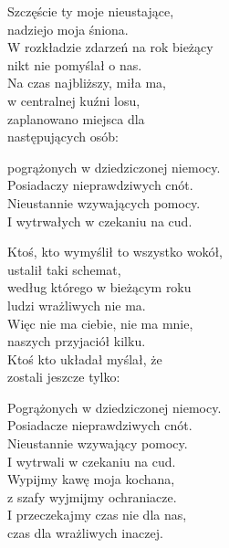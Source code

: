 \begin{text}
    Szczęście ty moje nieustające,\\
    nadziejo moja śniona.\\
    W rozkładzie zdarzeń na rok bieżący\\
    nikt nie pomyślał o nas.\\
    Na czas najbliższy, miła ma,\\
    w centralnej kuźni losu,\\
    zaplanowano miejsca dla\\
    następujących osób:

    pogrążonych w dziedziczonej niemocy.\\
    Posiadaczy nieprawdziwych cnót.\\
    Nieustannie wzywających pomocy.\\
    I wytrwałych w czekaniu na cud.

    Ktoś, kto wymyślił to wszystko wokół,\\
    ustalił taki schemat,\\
    według którego w bieżącym roku\\
    ludzi wrażliwych nie ma.\\
    Więc nie ma ciebie, nie ma mnie,\\
    naszych przyjaciół kilku.\\
    Ktoś kto układał myślał, że\\
    zostali jeszcze tylko:

    Pogrążonych w dziedziczonej niemocy.\\
    Posiadacze nieprawdziwych cnót.\\
    Nieustannie wzywający pomocy.\\
    I wytrwali w czekaniu na cud.\\

    Wypijmy kawę moja kochana,\\
    z szafy wyjmijmy ochraniacze.\\
    I przeczekajmy czas nie dla nas,\\
    czas dla wrażliwych inaczej.
\end{text}
\begin{chord}

\end{chord}